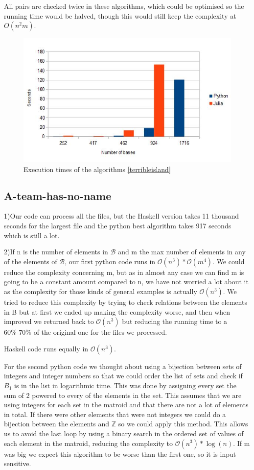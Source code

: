 \documentclass[11pt]{amsart}
\begin{document}
All pairs are checked twice in these algorithms, which could be optimised so the running time would be halved, though this would still keep the complexity at $O(n^{2}m)$.

\begin{figure}[h!]
	\centering
	\includegraphics[width=.7\textwidth]{./Terrible-Island/times.jpeg}
	\caption{Execution times of the algorithms \ref{terribleisland}}
	\label{figureterribleisland}
\end{figure}

\subsection{A-team-has-no-name}

1)Our code can process all the files, but the Haskell version takes 11 thousand seconds for the largest file and the python best algorithm takes 917 seconds which is still a lot.

2)If n is the number of elements in $\mathcal{B}$ and m the max number of elements in any of the elements of $\mathcal{B}$, our first python code runs in $\mathcal{O}(n^3)*\mathcal{O}(m^4)$.
We could reduce the complexity concerning m, but as in almost any case we can find m is going to be a constant amount compared to n, we have not worried a lot about it as the complexity for those kinds of general examples is actually $\mathcal{O}(n^3)$.
We tried to reduce this complexity by trying to check relations between the elements in B but at first we ended up making the complexity worse, and then when improved we returned back to $\mathcal{O}(n^3)$ but reducing the running time to a 60\%-70\% of the original one for the files we processed.

Haskell code runs equally in $\mathcal{O}(n^3)$.

For the second python code we thought about using a bijection between sets of integers and integer numbers so that we could order the list of sets and check if $B_1$ is in the list in logarithmic time.
This was done by assigning every set the sum of 2 powered to every of the elements in the set. 
This assumes that we are using integers for each set in the matroid and that there are not a lot of elements in total. If there were other elements that were not integers we could do a bijection between the elements and $\mathbb{Z}$ so we could apply this method.
This allows us to avoid the last loop by using a binary search in the ordered set of values of each element in the matroid, reducing the complexity to $\mathcal{O}(n^3)*\log(n)$. 
If m was big we expect this algorithm to be worse than the first one, so it is input sensitive. 
\end{document}
